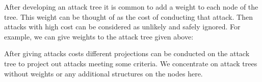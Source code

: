 \begin{full}
After developing an attack tree it is common to add a weight to each
node of the tree.  This weight can be thought of as the cost of
conducting that attack.  Then attacks with high cost can be considered
as unlikely and safely ignored.  For example, we can give weights to
the attack tree given above:
\begin{center}
\end{center}
After giving attacks costs different projections can be conducted on
the attack tree to project out attacks meeting some criteria.
We concentrate on attack trees without weights or any additional
structures on the nodes here.


\end{full}
